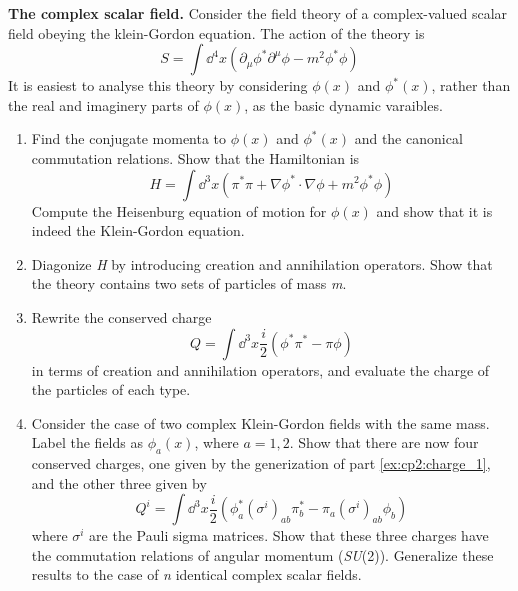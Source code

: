\problem \textbf{The complex scalar field.} Consider the field theory of a complex-valued scalar field obeying 
the klein-Gordon equation. The action of the theory is
\begin{equation}\label{equ:cp2:s_csf}
    S = \int \dd^4x \left(\partial_\mu \phi^\ast \partial^\mu \phi - m^2 \phi^\ast \phi\right)
\end{equation}
It is easiest to analyse this theory by considering $\phi(x)$ and $\phi^\ast(x)$, rather than the real and imaginery
parts of $\phi(x)$, as the basic dynamic varaibles.
\begin{enumerate}[label = {(\alph*)}, ref = {(\alph*)}]
    \item Find the conjugate momenta to $\phi(x)$ and $\phi^\ast(x)$ and the canonical commutation relations. Show 
    that the Hamiltonian is
    \begin{equation}\label{equ:cp2:h_csf}
        H = \int \dd^3x \left(\pi^\ast\pi + \nabla\phi^\ast \cdot \nabla\phi + m^2 \phi^\ast\phi\right)
    \end{equation}
    Compute the Heisenburg equation of motion for $\phi(x)$ and show that it is indeed the Klein-Gordon equation.
    
    \item Diagonize \textit{H} by introducing creation and annihilation operators. Show that the theory contains two 
    sets of particles of mass \textit{m}.
    
    \item \label{ex:cp2:charge_1} Rewrite the conserved charge
    \begin{equation}\label{equ:cp2:charge}
        Q = \int \dd^3x \frac{i}{2} \left(\phi^\ast \pi^\ast - \pi\phi\right)
    \end{equation}
    in terms of creation and annihilation operators, and evaluate the charge of the particles of each type.
    
    \item Consider the case of two complex Klein-Gordon fields with the same mass. Label the fields as $\phi_a(x)$,
    where $a = 1,2$. Show that there are now four conserved charges, one given by the generization of part \ref{ex:cp2:charge_1}, 
    and the other three given by
    \begin{equation}\label{equ:cp2:charge_2}
        Q^i = \int \dd^3x \frac{i}{2} (\phi^\ast_a (\sigma^i)_{ab} \pi^\ast_b - \pi_a (\sigma^i)_{ab} \phi_b)
    \end{equation}
    where $\sigma^i$ are the Pauli sigma matrices. Show that these three charges have the commutation relations of 
    angular momentum (\textit{SU}(2)). Generalize these results to the case of \textit{n} identical complex scalar 
    fields.
\end{enumerate}

